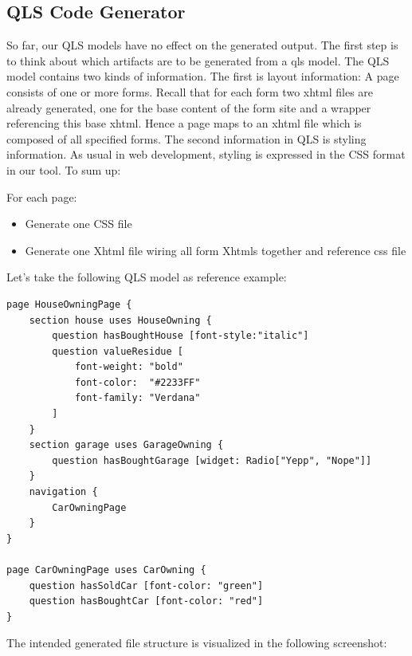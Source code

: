 \subsection{QLS Code Generator}

So far, our QLS models have no effect on the generated output. The first step
is to think about which artifacts are to be generated from a qls model. The QLS
model contains two kinds of information. The first is layout information: A page
consists of one or more forms. Recall that for each form two xhtml files are already generated,
one for the base content of the form site and a wrapper referencing this base xhtml.
Hence a page maps to an xhtml file which is composed of all specified forms. 
The second information in QLS is styling information. As usual in web development,
styling is expressed in the CSS format in our tool. To sum up:

For each page:
\begin{itemize}
  \item Generate one CSS file
  \item Generate one Xhtml file wiring all form Xhtmls together and reference css file 
\end{itemize}

Let's take the following QLS model as reference example:
\begin{lstlisting}[language=QLS]
page HouseOwningPage {
	section house uses HouseOwning {
		question hasBoughtHouse [font-style:"italic"]
		question valueResidue [
			font-weight: "bold" 
			font-color:  "#2233FF"
			font-family: "Verdana"
		]
	}
	section garage uses GarageOwning {
		question hasBoughtGarage [widget: Radio["Yepp", "Nope"]]		
	}
	navigation {
		CarOwningPage
	}
}

page CarOwningPage uses CarOwning {
	question hasSoldCar [font-color: "green"]
	question hasBoughtCar [font-color: "red"]
}
\end{lstlisting}

The intended generated file structure is visualized in the following screenshot:

